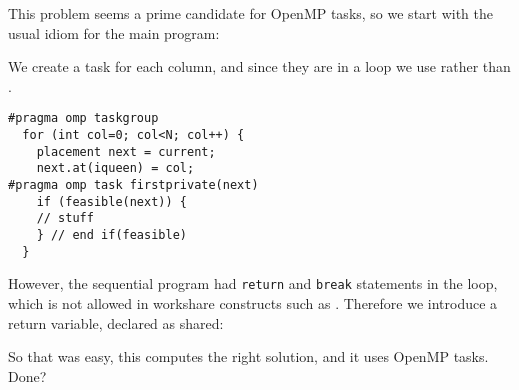 This problem seems a prime candidate for OpenMP tasks, so we start with the usual
idiom for the main program:
%

We create a task for each column, and since they are in a loop
we use  rather than .
\begin{lstlisting}
#pragma omp taskgroup
  for (int col=0; col<N; col++) {
    placement next = current;
    next.at(iqueen) = col;
#pragma omp task firstprivate(next)
    if (feasible(next)) {
    // stuff
    } // end if(feasible)
  }
\end{lstlisting}

However, the sequential program had \lstinline{return} and \lstinline{break}
statements in the loop, which is not allowed in workshare constructs
such as .
Therefore we introduce a return variable, declared as shared:
%

So that was easy, this computes the right solution, and it uses OpenMP tasks.
Done?




